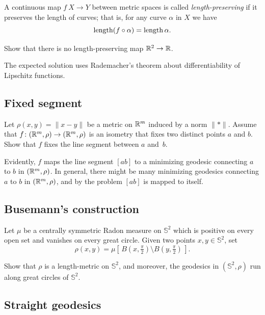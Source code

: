 A continuous map $f\:X\to Y$ between metric spaces is called \emph{length-preserving} if it preserves the length of curves; 
that is, for any curve $\alpha$ in $X$ we have
\[\operatorname{\rm length}(f\circ\alpha)=\operatorname{\rm length}\alpha.\]

\begin{pr}
Show that there is no length-preserving map $\mathbb{R}^2\to \mathbb{R}$.
\end{pr}

The expected solution uses Rademacher's theorem \cite{rademacher} about differentiability of Lipschitz functions. 

\subsection*{Fixed segment}
\label{Fixed segment}

\begin{pr}
Let $\rho(x,y)=\|x-y\|$ be a metric on $\mathbb{R}^m$ induced by a norm $\|{*}\|$.
Assume that $f\colon(\mathbb{R}^m,\rho)\to(\mathbb{R}^m,\rho)$ is an isometry that fixes two distinct points $a$ and $b$.
Show that $f$ fixes the line segment between $a$ and~$b$.
\end{pr}

Evidently, $f$ maps the line segment $[ab]$ to a minimizing geodesic connecting $a$ to $b$ in $(\mathbb{R}^m,\rho)$.
In general, there might be many minimizing geodesics connecting $a$ to $b$ in $(\mathbb{R}^m,\rho)$, and by the problem $[ab]$ is mapped to itself.

\subsection*{Busemann's construction\easy}
\label{Pogorelov's construction}

\begin{pr}
Let $\mu$ be a centrally symmetric Radon measure on $\mathbb{S}^2$ which is positive on every open set and vanishes on every great circle.
Given two points $x,y\in \mathbb{S}^2$, set
\[\rho(x,y)=\mu[\,B(x,\tfrac \pi2)\setminus B(y,\tfrac\pi2)\,].\]

Show that $\rho$ is a length-metric on $\mathbb{S}^2$, and moreover, the geodesics in $(\mathbb{S}^2,\rho)$ run along great circles of $\mathbb{S}^2$.
\end{pr}

\subsection*{Straight geodesics}
\label{Straight geodesics}

